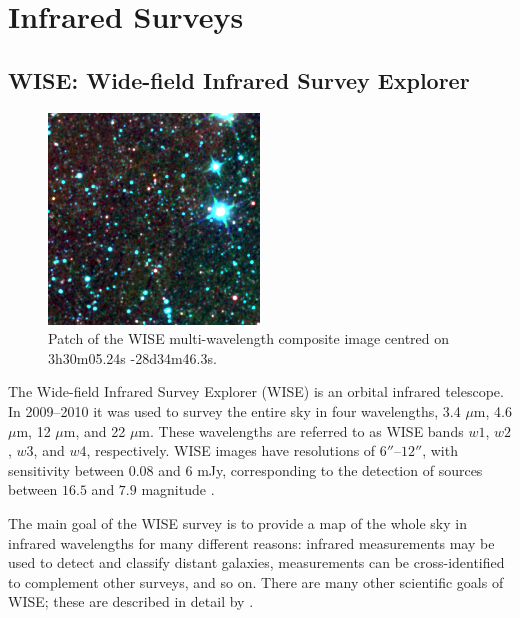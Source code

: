     \section{Infrared Surveys}
    \label{sec:infrared-surveys}

        \subsection{WISE: Wide-field Infrared Survey Explorer}
        \label{sec:wise}

            \begin{figure}[!ht]
                \centering
                \includegraphics[width=0.5\textwidth]
                    {images/WISE_3h30m05.24s-28d34m46.3s.png}
                \caption{Patch of the WISE multi-wavelength composite image
                    centred on 3h30m05.24s -28d34m46.3s.}
                \label{fig:wise}
            \end{figure}

            The Wide-field Infrared Survey Explorer (WISE) is an orbital
            infrared telescope. In 2009--2010 it was used to survey the entire
            sky in four wavelengths, 3.4 $\mu$m, 4.6 $\mu$m, 12 $\mu$m, and 22
            $\mu$m. These wavelengths are referred to as WISE bands $w1$, $w2$,
            $w3$, and $w4$, respectively. WISE images have resolutions of
            $6''$--$12''$, with sensitivity between $0.08$ and $6$ mJy,
            corresponding to the detection of sources between $16.5$ and $7.9$
            magnitude \citep{wright10}.

            The main goal of the WISE survey is to provide a map of the whole
            sky in infrared wavelengths for many different reasons: infrared
            measurements may be used to detect and classify distant galaxies,
            measurements can be cross-identified to complement other surveys,
            and so on. There are many other scientific goals of WISE; these are
            described in detail by \citet{wright10}.

